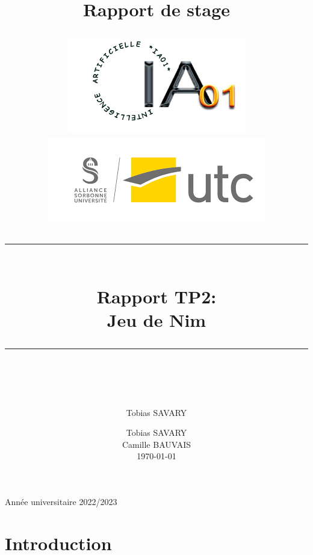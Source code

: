 \documentclass[
]{article}
\newcommand{\HRule}[1]{\rule{\linewidth}{#1}}
\begin{document}
\title{Rapport de stage}
\author{Tobias SAVARY}
\date{}


\title{ \begin{center}
            \includegraphics[scale = 0.5]{img/logo_IA01.png} \hspace*{1cm}
            \includegraphics[scale = 0.6]{img/logo_UTC.png} \\ [2cm]
        \end{center} 
		\HRule{2pt} \\
		\LARGE \textbf{Rapport TP2:\\Jeu de Nim} 
		\HRule{2pt} \\ [5.5cm]
		\normalsize  
        \author{
            Tobias SAVARY \\[0.5cm]
            Camille BAUVAIS \\[1cm]
        \today}
		}
        
		\maketitle
        \begin{center}
            Année universitaire 2022/2023
        \end{center}
\pagebreak



\tableofcontents



\pagebreak

\hypertarget{introduction}{%
\section{Introduction}\label{introduction}}
\end{document}
